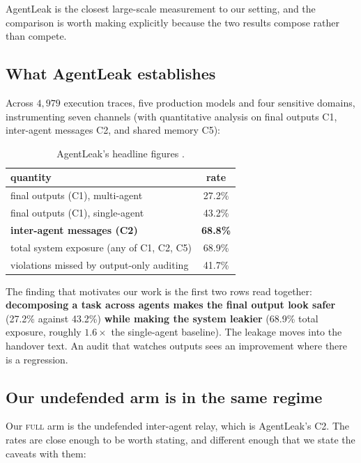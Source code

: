 \documentclass[11pt]{article}
\begin{document}
AgentLeak \cite{agentleak} is the closest large-scale measurement to our setting,
and the comparison is worth making explicitly because the two results compose
rather than compete.

\subsection{What AgentLeak establishes}

Across $4{,}979$ execution traces, five production models and four sensitive
domains, instrumenting seven channels (with quantitative analysis on final
outputs C1, inter-agent messages C2, and shared memory C5):

\begin{table}[h]
\centering
\begin{tabular}{lc}
\toprule
quantity & rate \\
\midrule
final outputs (C1), multi-agent & 27.2\% \\
final outputs (C1), single-agent & 43.2\% \\
\textbf{inter-agent messages (C2)} & \textbf{68.8\%} \\
total system exposure (any of C1, C2, C5) & 68.9\% \\
violations missed by output-only auditing & 41.7\% \\
\bottomrule
\end{tabular}
\caption{AgentLeak's headline figures \cite{agentleak}.}
\label{tab:agentleak}
\end{table}

The finding that motivates our work is the first two rows read together:
\textbf{decomposing a task across agents makes the final output look safer}
(27.2\% against 43.2\%) \textbf{while making the system leakier} (68.9\% total
exposure, roughly $1.6\times$ the single-agent baseline). The leakage moves into
the handover text. An audit that watches outputs sees an improvement where there
is a regression.

\subsection{Our undefended arm is in the same regime}

Our \textsc{full} arm is the undefended inter-agent relay, which is AgentLeak's
C2. The rates are close enough to be worth stating, and different enough that we
state the caveats with them:
\end{document}
